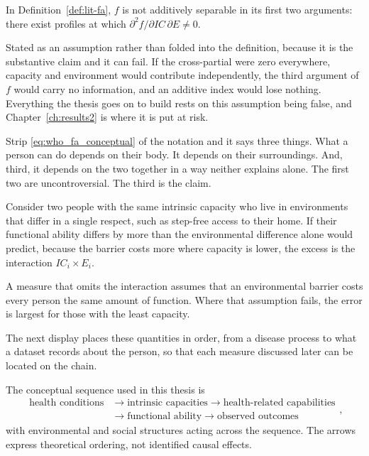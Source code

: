 \begin{assumption}
\label{ass:lit-interaction}
In Definition~\ref{def:lit-fa}, $f$ is not additively separable in its first
two arguments: there exist profiles at which
$\partial^2 f/\partial IC\,\partial E\neq0$.
\end{assumption}

Stated as an assumption rather than folded into the definition, because it is
the substantive claim and it can fail. If the cross-partial were zero
everywhere, capacity and environment would contribute independently, the third
argument of $f$ would carry no information, and an additive index would lose
nothing. Everything the thesis goes on to build rests on this assumption being
false, and Chapter~\ref{ch:results2} is where it is put at risk.

\begin{reading}
Strip \eqref{eq:who_fa_conceptual} of the notation and it says three things.
What a person can do depends on their body. It depends on their surroundings.
And, third, it depends on the two together in a way neither explains alone.
The first two are uncontroversial. The third is the claim.

Consider two people with the same intrinsic capacity who live in environments that differ in a single respect, such as step-free access to their home. If their functional ability differs by more than the environmental difference alone would predict, because the barrier costs more where capacity is lower, the excess is the interaction $IC_i\times E_i$.

A measure that omits the interaction assumes that an environmental barrier costs every person the same amount of function. Where that assumption fails, the error is largest for those with the least capacity.
\end{reading}

The next display places these quantities in order, from a disease process to what a dataset records about the person, so that each measure discussed later can be located on the chain.

The conceptual sequence used in this thesis is \citep{who_2015_ageing}
\begin{equation}
\boxed{\begin{aligned}
\text{health conditions}&\longrightarrow\text{intrinsic capacities}
\longrightarrow\text{health-related capabilities}\\
&\longrightarrow\text{functional ability}
\longrightarrow\text{observed outcomes}
\end{aligned}},
\label{eq:conceptual_sequence}
\end{equation}
with environmental and social structures acting across the sequence. The
arrows express theoretical ordering, not identified causal effects.


